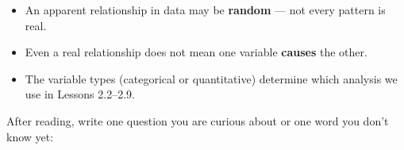 \documentclass[10pt]{article}
\begin{document}
\vspace{0.14in}

\begin{tcolorbox}[colback=greenbg, colframe=greenacc, boxrule=0.8pt, arc=2mm,
    left=4mm, right=4mm, top=3mm, bottom=3mm]
    \small
    \begin{itemize}[leftmargin=1.3em, itemsep=8pt]
  \item An apparent relationship in data may be \textbf{random} --- not every pattern is real.
  \item Even a real relationship does not mean one variable \textbf{causes} the other.
  \item The variable types (categorical or quantitative) determine which analysis we use
        in Lessons 2.2--2.9.
    \end{itemize}
\end{tcolorbox}

\vspace{0.2in}

\noindent\textcolor{slate}{\small After reading, write one question you are curious about
or one word you don't know yet:}\\[8pt]
\writeline\\[2pt]\writeline
\end{document}
